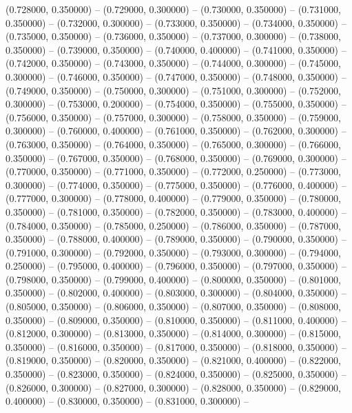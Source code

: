 (0.728000, 0.350000) -- 
(0.729000, 0.300000) -- 
(0.730000, 0.350000) -- 
(0.731000, 0.350000) -- 
(0.732000, 0.300000) -- 
(0.733000, 0.350000) -- 
(0.734000, 0.350000) -- 
(0.735000, 0.350000) -- 
(0.736000, 0.350000) -- 
(0.737000, 0.300000) -- 
(0.738000, 0.350000) -- 
(0.739000, 0.350000) -- 
(0.740000, 0.400000) -- 
(0.741000, 0.350000) -- 
(0.742000, 0.350000) -- 
(0.743000, 0.350000) -- 
(0.744000, 0.300000) -- 
(0.745000, 0.300000) -- 
(0.746000, 0.350000) -- 
(0.747000, 0.350000) -- 
(0.748000, 0.350000) -- 
(0.749000, 0.350000) -- 
(0.750000, 0.300000) -- 
(0.751000, 0.300000) -- 
(0.752000, 0.300000) -- 
(0.753000, 0.200000) -- 
(0.754000, 0.350000) -- 
(0.755000, 0.350000) -- 
(0.756000, 0.350000) -- 
(0.757000, 0.300000) -- 
(0.758000, 0.350000) -- 
(0.759000, 0.300000) -- 
(0.760000, 0.400000) -- 
(0.761000, 0.350000) -- 
(0.762000, 0.300000) -- 
(0.763000, 0.350000) -- 
(0.764000, 0.350000) -- 
(0.765000, 0.300000) -- 
(0.766000, 0.350000) -- 
(0.767000, 0.350000) -- 
(0.768000, 0.350000) -- 
(0.769000, 0.300000) -- 
(0.770000, 0.350000) -- 
(0.771000, 0.350000) -- 
(0.772000, 0.250000) -- 
(0.773000, 0.300000) -- 
(0.774000, 0.350000) -- 
(0.775000, 0.350000) -- 
(0.776000, 0.400000) -- 
(0.777000, 0.300000) -- 
(0.778000, 0.400000) -- 
(0.779000, 0.350000) -- 
(0.780000, 0.350000) -- 
(0.781000, 0.350000) -- 
(0.782000, 0.350000) -- 
(0.783000, 0.400000) -- 
(0.784000, 0.350000) -- 
(0.785000, 0.250000) -- 
(0.786000, 0.350000) -- 
(0.787000, 0.350000) -- 
(0.788000, 0.400000) -- 
(0.789000, 0.350000) -- 
(0.790000, 0.350000) -- 
(0.791000, 0.300000) -- 
(0.792000, 0.350000) -- 
(0.793000, 0.300000) -- 
(0.794000, 0.250000) -- 
(0.795000, 0.400000) -- 
(0.796000, 0.350000) -- 
(0.797000, 0.350000) -- 
(0.798000, 0.350000) -- 
(0.799000, 0.400000) -- 
(0.800000, 0.350000) -- 
(0.801000, 0.350000) -- 
(0.802000, 0.400000) -- 
(0.803000, 0.300000) -- 
(0.804000, 0.350000) -- 
(0.805000, 0.350000) -- 
(0.806000, 0.350000) -- 
(0.807000, 0.350000) -- 
(0.808000, 0.350000) -- 
(0.809000, 0.350000) -- 
(0.810000, 0.350000) -- 
(0.811000, 0.400000) -- 
(0.812000, 0.300000) -- 
(0.813000, 0.350000) -- 
(0.814000, 0.300000) -- 
(0.815000, 0.350000) -- 
(0.816000, 0.350000) -- 
(0.817000, 0.350000) -- 
(0.818000, 0.350000) -- 
(0.819000, 0.350000) -- 
(0.820000, 0.350000) -- 
(0.821000, 0.400000) -- 
(0.822000, 0.350000) -- 
(0.823000, 0.350000) -- 
(0.824000, 0.350000) -- 
(0.825000, 0.350000) -- 
(0.826000, 0.300000) -- 
(0.827000, 0.300000) -- 
(0.828000, 0.350000) -- 
(0.829000, 0.400000) -- 
(0.830000, 0.350000) -- 
(0.831000, 0.300000) -- 
